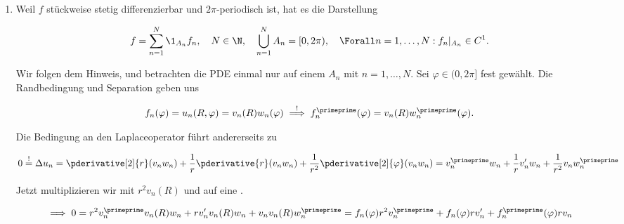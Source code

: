 
\begin{solution}

\phantom{}

\begin{enumerate}[label = (\roman*)]

    \item Weil $f$ stückweise stetig differenzierbar und $2 \pi$-periodisch ist, hat es die Darstellung

    \begin{align*}
        f = \sum_{n=1}^N \1_{A_n} f_n,
        \quad
        N \in \N,
        \quad
        \bigcup_{n=1}^N A_n = [0, 2 \pi),
        \quad
        \Forall n = 1, \ldots, N:
        f_n |_{A_n} \in C^1.
    \end{align*}

    Wir folgen dem Hinweis, und betrachten die PDE einmal nur auf einem $A_n$ mit $n = 1, \ldots, N$.
    Sei $\varphi \in (0, 2 \pi]$ fest gewählt.
    Die Randbedingung und Separation geben uns

    \begin{align*}
        f_n(\varphi) = u_n(R, \varphi) = v_n(R) w_n(\varphi)
        \stackrel{!}{\implies}
        f_n^\primeprime(\varphi) = v_n(R) w_n^\primeprime(\varphi).
    \end{align*}

    Die Bedingung an den Laplaceoperator führt andererseits zu

    \begin{align*}
        0 \stackrel{!}{=}
        \Delta u_n
        =
        \pderivative[2]{r} (v_n w_n)
        +
        \frac{1}{r} \pderivative{r} (v_n w_n)
        +
        \frac{1}{r^2} \pderivative[2]{\varphi} (v_n w_n)
        =
        v_n^\primeprime w_n
        +
        \frac{1}{r} v_n^\prime w_n
        +
        \frac{1}{r^2} v_n w_n^\primeprime \\
    \end{align*}

    Jetzt multiplizieren wir mit $r^2 v_n(R)$ und  auf eine .

    \begin{align*}
        \implies
        0 =
        r^2 v_n^\primeprime v_n(R) w_n
        +
        r v_n^\prime v_n(R) w_n
        +
        v_n v_n(R) w_n^\primeprime
        =
        f_n(\varphi) r^2 v_n^\primeprime
        +
        f_n(\varphi) r v_n^\prime
        +
        f_n^\primeprime(\varphi) r v_n
    \end{align*}


\end{enumerate}
\end{solution}
